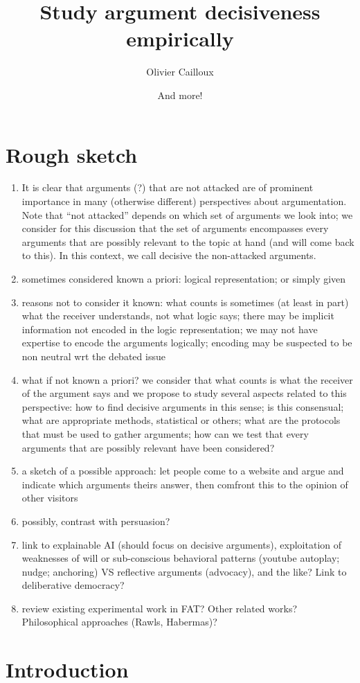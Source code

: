 \documentclass[version=3.21, pagesize, twoside=off, bibliography=totoc, DIV=calc, fontsize=12pt, a4paper]{scrartcl}
\title{Study argument decisiveness empirically}
\author{Olivier Cailloux}
\affil{Université Paris-Dauphine, PSL Research University, CNRS, LAMSADE, 75016 PARIS, FRANCE\\
	\href{mailto:olivier.cailloux@dauphine.fr}{olivier.cailloux@dauphine.fr}
}
\author{And more!}
\affil{Affil2}
\begin{document}
\maketitle

\section{Rough sketch}
\begin{enumerate}
	\item It is clear that arguments (?) that are not attacked are of prominent importance in many (otherwise different) perspectives about argumentation. Note that “not attacked” depends on which set of arguments we look into; we consider for this discussion that the set of arguments encompasses every arguments that are possibly relevant to the topic at hand (and will come back to this). In this context, we call decisive the non-attacked arguments.
	\item sometimes considered known a priori: logical representation; or simply given
	\item reasons not to consider it known: what counts is sometimes (at least in part) what the receiver understands, not what logic says; there may be implicit information not encoded in the logic representation; we may not have expertise to encode the arguments logically; encoding may be suspected to be non neutral wrt the debated issue
	\item what if not known a priori? we consider that what counts is what the receiver of the argument says and we propose to study several aspects related to this perspective: how to find decisive arguments in this sense; is this consensual; what are appropriate methods, statistical or others; what are the protocols that must be used to gather arguments; how can we test that every arguments that are possibly relevant have been considered?
	\item a sketch of a possible approach: let people come to a website and argue and indicate which arguments theirs answer, then comfront this to the opinion of other visitors
	\item possibly, contrast with persuasion?
	\item link to explainable AI (should focus on decisive arguments), exploitation of weaknesses of will or sub-conscious behavioral patterns (youtube autoplay; nudge; anchoring) VS reflective arguments (advocacy), and the like? Link to deliberative democracy?
	\item review existing experimental work in FAT? Other related works? Philosophical approaches (Rawls, Habermas)?
\end{enumerate}

\section{Introduction}
\label{sec:intro}

%
\end{document}
